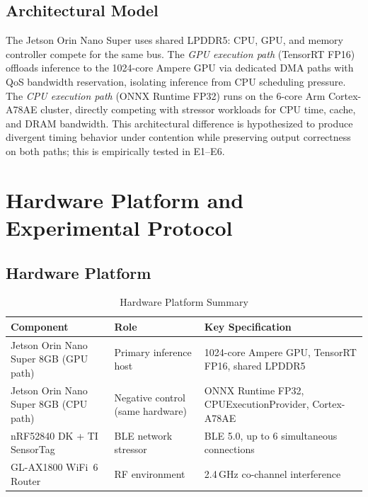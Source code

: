 \documentclass[journal,10pt,twocolumn]{IEEEtran}
\begin{document}
\subsection{Architectural Model}

The Jetson Orin Nano Super uses shared LPDDR5: CPU, GPU, and memory
controller compete for the same bus.
The \emph{GPU execution path} (TensorRT FP16) offloads inference to the
1024-core Ampere GPU via dedicated DMA paths with QoS bandwidth
reservation, isolating inference from CPU scheduling pressure.
The \emph{CPU execution path} (ONNX Runtime FP32) runs on the
6-core Arm Cortex-A78AE cluster, directly competing with stressor
workloads for CPU time, cache, and DRAM bandwidth.
This architectural difference is hypothesized to produce divergent
timing behavior under contention while preserving output correctness on both paths; this is empirically tested in E1--E6.

\section{Hardware Platform and Experimental Protocol}

\subsection{Hardware Platform}

\begin{table}[!t]
\caption{Hardware Platform Summary}
\label{tab:hardware}
\centering
\small
\begin{tabular}{p{2.4cm}p{1.5cm}p{3.6cm}}
\toprule
\textbf{Component} & \textbf{Role} & \textbf{Key Specification} \\
\midrule
Jetson Orin Nano Super 8GB (GPU path)
  & Primary inference host
  & 1024-core Ampere GPU, TensorRT FP16, shared LPDDR5 \\
Jetson Orin Nano Super 8GB (CPU path)
  & Negative control (same hardware)
  & ONNX Runtime FP32, CPUExecutionProvider, Cortex-A78AE \\
nRF52840 DK + TI SensorTag
  & BLE network stressor
  & BLE 5.0, up to 6 simultaneous connections \\
GL-AX1800 WiFi~6 Router
  & RF environment
  & 2.4\,GHz co-channel interference \\
\bottomrule
\end{tabular}
\end{table}
\end{document}
